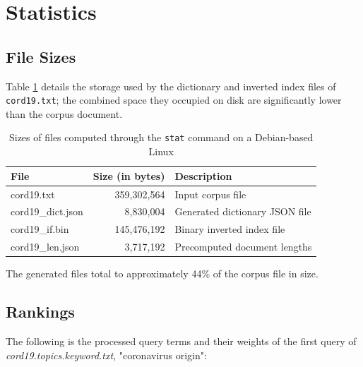 \documentclass[11pt]{article}
\begin{document}
\section{Statistics}

\subsection{File Sizes}
Table \ref{sizes} details the storage used by the dictionary and inverted index files of \texttt{cord19.txt}; the combined space they occupied on disk are significantly lower than the corpus document.

\begin{table}[!ht]
    \caption{Sizes of files computed through the \texttt{stat} command on a Debian-based Linux}
    \begin{center} \label{sizes}

        \begin{tabular}{| l | r | l |}
        \hline
        \textbf{File} & \textbf{Size (in bytes)} & \textbf{Description} \\
        \hline
        cord19.txt & 359,302,564 & Input corpus file
        \\ \hline
        cord19\_dict.json & 8,830,004 & Generated dictionary JSON file
        \\ \hline
        cord19\_if.bin & 145,476,192 & Binary inverted index file
        \\ \hline
        cord19\_len.json & 3,717,192 & Precomputed document lengths
        \\ \hline
        \end{tabular}

    \end{center}

\end{table}

The generated files total to approximately 44\% of the corpus file in size.

\subsection{Rankings}
The following is the processed query terms and their weights of the first query of \textit{cord19.topics.keyword.txt}, "coronavirus origin":

\end{document}
